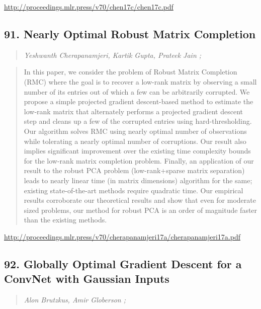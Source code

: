 \documentclass{article}
\begin{document}
\href{http://proceedings.mlr.press/v70/chen17c/chen17c.pdf}{http://proceedings.mlr.press/v70/chen17c/chen17c.pdf}

\subsection{91. Nearly Optimal Robust Matrix Completion}

\begin{quote}
\footnotesize{\textit{Yeshwanth Cherapanamjeri, Kartik Gupta, Prateek Jain ;}}

\end{quote}

\begin{quote}
    In this paper, we consider the problem of Robust Matrix Completion (RMC) where the goal is to recover a low-rank matrix by observing a small number of its entries out of which a few can be arbitrarily corrupted. We propose a simple projected gradient descent-based method to estimate the low-rank matrix that alternately performs a projected gradient descent step and cleans up a few of the corrupted entries using hard-thresholding. Our algorithm solves RMC using nearly optimal number of observations while tolerating a nearly optimal number of corruptions. Our result also implies significant improvement over the existing time complexity bounds for the low-rank matrix completion problem. Finally, an application of our result to the robust PCA problem (low-rank+sparse matrix separation) leads to nearly linear time (in matrix dimensions) algorithm for the same; existing state-of-the-art methods require quadratic time. Our empirical results corroborate our theoretical results and show that even for moderate sized problems, our method for robust PCA is an order of magnitude faster than the existing methods.  
\end{quote}

\href{http://proceedings.mlr.press/v70/cherapanamjeri17a/cherapanamjeri17a.pdf}{http://proceedings.mlr.press/v70/cherapanamjeri17a/cherapanamjeri17a.pdf}

\subsection{92. Globally Optimal Gradient Descent for a ConvNet with Gaussian Inputs}

\begin{quote}
\footnotesize{\textit{Alon Brutzkus, Amir Globerson ;}}

\end{quote}
\end{document}
